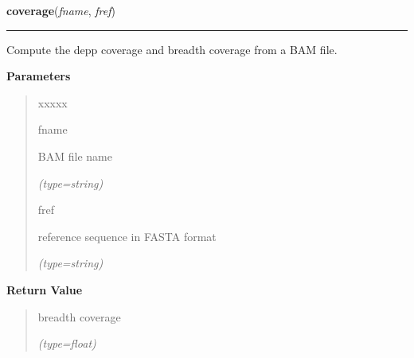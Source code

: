 \hspace{.8\funcindent}\begin{boxedminipage}{\funcwidth}

    \raggedright \textbf{coverage}(\textit{fname}, \textit{fref})

    \vspace{-1.5ex}

    \rule{\textwidth}{0.5\fboxrule}
\setlength{\parskip}{2ex}
    Compute the depp coverage and breadth coverage from a BAM file.

\setlength{\parskip}{1ex}
      \textbf{Parameters}
      \vspace{-1ex}

      \begin{quote}
        \begin{Ventry}{xxxxx}

          \item[fname]

          BAM file name

            {\it (type=string)}

          \item[fref]

          reference sequence in FASTA format

            {\it (type=string)}

        \end{Ventry}

      \end{quote}

      \textbf{Return Value}
    \vspace{-1ex}

      \begin{quote}
      breadth coverage

      {\it (type=float)}

      \end{quote}

    \end{boxedminipage}

    \label{script-BAMmaker:checkPredScore}

    \vspace{0.5ex}

